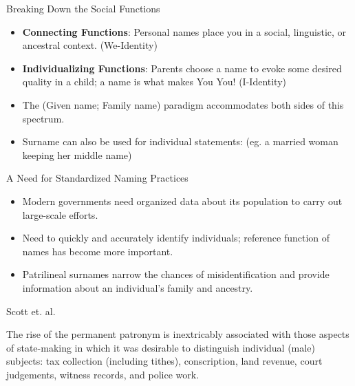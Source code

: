 \documentclass{beamer}
\begin{document}
\begin{frame}{Breaking Down the Social Functions}
\begin{itemize}
\item \textbf{Connecting Functions}: Personal names place you in a social,
linguistic, or ancestral context. (We-Identity)
\item \textbf{Individualizing Functions}: Parents choose a name to evoke some
desired quality in a child; a name is what makes You You! (I-Identity)
\item The (Given name; Family name) paradigm accommodates both sides of this
spectrum.
\item Surname can also be used for individual statements: (eg. a married woman
keeping her middle name)
\end{itemize}
\end{frame}

\begin{frame}{A Need for Standardized Naming Practices}
\begin{itemize}
\item Modern governments need organized data about its population to carry
out large-scale efforts.
\item Need to quickly and accurately identify individuals; reference function of
names has become more important.
\item Patrilineal surnames narrow the chances of misidentification and provide
information about an individual's family and ancestry.
\end{itemize}
\end{frame}

\begin{frame}{Scott et. al.}
\begin{aquote}{\textcite{scott02}}
The rise of the permanent patronym is inextricably associated with those aspects
of state-making in which it was desirable to distinguish individual (male)
subjects: tax collection (including tithes), conscription, land revenue, court
judgements, witness records, and police work.
\end{aquote}
\end{frame}
\end{document}
